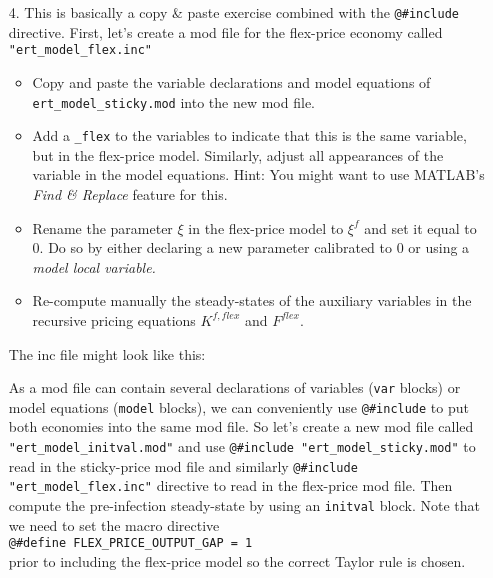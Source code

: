 \begin{itemize}
\item[4.] This is basically a copy \& paste exercise combined with the \texttt{@\#include} directive.
First, let's create a mod file for the flex-price economy called \texttt{"ert\_model\_flex.inc"}
\begin{itemize}
    \item Copy and paste the variable declarations and model equations of \texttt{ert\_model\_sticky.mod} into the new mod file.
    \item Add a \texttt{\_flex} to the variables to indicate that this is the same variable,
      but in the flex-price model.
    Similarly, adjust all appearances of the variable in the model equations.
    Hint: You might want to use MATLAB's \emph{Find \& Replace} feature for this.
    \item Rename the parameter $\xi$ in the flex-price model to $\xi^f$ and set it equal to 0.
    Do so by either declaring a new parameter calibrated to 0 or using a \emph{model local variable.}
    \item Re-compute manually the steady-states of the auxiliary variables in the recursive pricing equations $K^{f,flex}$ and $F^{flex}$.
\end{itemize}
The inc file might look like this:

As a mod file can contain several declarations of variables (\texttt{var} blocks) or model equations (\texttt{model} blocks),
  we can conveniently use \texttt{@\#include} to put both economies into the same mod file.
So let's create a new mod file called \texttt{"ert\_model\_initval.mod"}
  and use \texttt{@\#include "ert\_model\_sticky.mod"} to read in the sticky-price mod file
  and similarly \texttt{@\#include "ert\_model\_flex.inc"} directive to read in the flex-price mod file.
Then compute the pre-infection steady-state by using an \texttt{initval} block.
Note that we need to set the macro directive\\\texttt{@\#define FLEX\_PRICE\_OUTPUT\_GAP = 1}\\
  prior to including the flex-price model so the correct Taylor rule is chosen.



\end{itemize}
